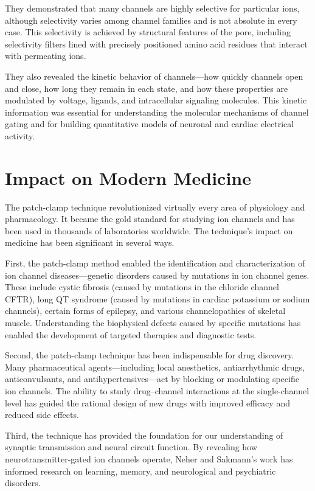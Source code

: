 They demonstrated that many channels are highly selective for particular ions, although selectivity varies among channel families and is not absolute in every case. This selectivity is achieved by structural features of the pore, including selectivity filters lined with precisely positioned amino acid residues that interact with permeating ions.

They also revealed the kinetic behavior of channels---how quickly channels open and close, how long they remain in each state, and how these properties are modulated by voltage, ligands, and intracellular signaling molecules. This kinetic information was essential for understanding the molecular mechanisms of channel gating and for building quantitative models of neuronal and cardiac electrical activity.

\section{Impact on Modern Medicine}

The patch-clamp technique revolutionized virtually every area of physiology and pharmacology. It became the gold standard for studying ion channels and has been used in thousands of laboratories worldwide. The technique's impact on medicine has been significant in several ways.

First, the patch-clamp method enabled the identification and characterization of ion channel diseases---genetic disorders caused by mutations in ion channel genes. These include cystic fibrosis (caused by mutations in the chloride channel CFTR), long QT syndrome (caused by mutations in cardiac potassium or sodium channels), certain forms of epilepsy, and various channelopathies of skeletal muscle. Understanding the biophysical defects caused by specific mutations has enabled the development of targeted therapies and diagnostic tests.

Second, the patch-clamp technique has been indispensable for drug discovery. Many pharmaceutical agents---including local anesthetics, antiarrhythmic drugs, anticonvulsants, and antihypertensives---act by blocking or modulating specific ion channels. The ability to study drug--channel interactions at the single-channel level has guided the rational design of new drugs with improved efficacy and reduced side effects.

Third, the technique has provided the foundation for our understanding of synaptic transmission and neural circuit function. By revealing how neurotransmitter-gated ion channels operate, Neher and Sakmann's work has informed research on learning, memory, and neurological and psychiatric disorders.

